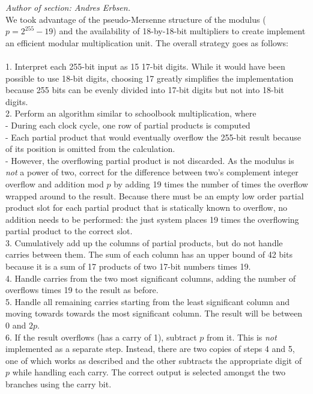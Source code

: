\documentclass[a4paper]{report}
\begin{document}
\emph{Author of section: Andres Erbsen.} \\

We took advantage of the pseudo-Mersenne structure of the modulus
($p=2^{255}-19$) and the availability of 18-by-18-bit multipliers to create
implement an efficient modular multiplication unit. The overall strategy goes as
follows: \\ \\
1. Interpret each 255-bit input as 15 17-bit digits. While it would have been
possible to use 18-bit digits, choosing 17 greatly simplifies the implementation
because 255 bits can be evenly divided into 17-bit digits but not into 18-bit
digits. \\
2. Perform an algorithm similar to schoolbook multiplication, where \\
- During each clock cycle, one row of partial products is computed \\
- Each partial product that would eventually overflow the 255-bit result
because of its position is omitted from the calculation. \\
- However, the overflowing partial product is not discarded. As the modulus
is \emph{not} a power of two, correct for the difference between two's
complement integer overflow and addition mod $p$ by adding 19 times the number
of times the overflow wrapped around to the result. Because there must be an
empty low order partial product slot for each partial product that is statically
known to overflow, no addition needs to be performed: the just system places 19
times the overflowing partial product to the correct slot. \\
3. Cumulatively add up the columns of partial products, but do not handle
carries between them. The sum of each column has an upper bound of 42 bits
because it is a sum of 17 products of two 17-bit numbers times 19. \\
4. Handle carries from the two most significant columns, adding the number of
overflows times 19 to the result as before. \\
5. Handle all remaining carries starting from the least significant column and
moving towards towards the most significant column. The result will %
be between $0$ and $2p$. \\
6. If the result overflows (has a carry of 1), subtract $p$ from it. This is \emph{not}  implemented as a
separate step. Instead, there are two copies of steps 4 and 5, one of which
works as described and the other subtracts the appropriate digit of $p$ while
handling each carry. The correct output is selected amongst the two branches
using the carry bit. \\
\end{document}
